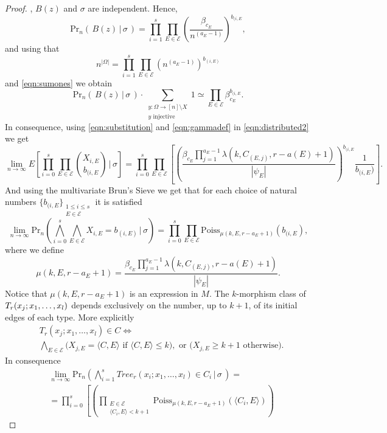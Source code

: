 \documentclass[11pt,notitlepage,a4paper]{article}
\theoremstyle{definition}
\newcommand{\Ln}{\lim\limits_{n\to \infty}}
\begin{document}
\begin{proof}
 	, $B(z)$ and $\sigma$ are independent. Hence,
 	\[ \mathrm{Pr}_n(\, B(z) \, | \, \sigma \, ) = \prod_{i=1}^{s} 
 	\prod_{E\in \mathcal{E}} \left(\frac{\beta_{c_E}}{n^{(a_E -1)}}
 	\right)^{b_{(i,E}},  \]
 	and using that
 	\[  n^{|\Omega|}= \prod_{i=1}^{s} 
 	\prod_{E\in \mathcal{E}} (n^{(a_E-1)})^{b_{(i,E)}}  \]
 	and \cref{eqn:sumones} we obtain 
 	\begin{equation} \label{eqn:substitution}
 	\mathrm{Pr}_n(\, B(z) \, | \, \sigma \, )\cdot \sum_{\substack{y:
 	\Omega \rightarrow [n]\setminus X\\ y \text{ injective}}} 1 \simeq 	
 	\prod_{E\in \mathcal{E}} \beta_{c_E}^{b_{(i,E}}. 
 	\end{equation}
 	In consequence, using \cref{eqn:substitution} and \cref{eqn:gammadef} in
 	\cref{eqn:distributed2} we get
 	\[ \Ln E\left[\prod_{i=0}^{s}\prod_{E\in \mathcal{E}}
 	\binom{X_{i,E}}{b_{(i,E}} \, \Bigg| \, \sigma \right]= \prod_{i=0}^{s}\prod_{E\in \mathcal{E}}
 	\left[ 	\left(\frac{\beta_{c_E} \prod_{j=1}^{a_E -1} \lambda(k,C_{(E,j)},r-a(E)+1)}{|\psi_E|}\right)^{b_{(i,E}} \frac{1}{b_{(i,E})} \right]. \]
 	And using the multivariate Brun's Sieve we get that for each
 	choice of natural numbers $\{b_{(i,E}\}_{\substack{1\leq i \leq s\\ 
 	E\in \mathcal{E}}}$ it is satisfied
 	\[ \Ln \mathrm{Pr}_n\left(\bigwedge_{i=0}^{s}\bigwedge_{E\in \mathcal{E}} X_{i,E}=b_{(i,E)} \, \Bigg| \, \sigma \right) = 
 	\prod_{i=0}^{s}\prod_{E\in \mathcal{E}}
 	\mathrm{Poiss}_{\mu(k,E,r-a_E+1)}(b_{(i,E}),\]
 	where we define
 	\[\mu(k,E,r-a_E+1)=
 	\frac{\beta_{c_E} \prod_{j=1}^{a_E -1} \lambda(k,C_{(E,j)},r-a(E)+1) }{|\psi_E|}.\]
 	Notice that $\mu(k,E,r-a_E+1)$ is an expression in $M$.
 	The $k$-morphism class of $\\T_r(x_j;x_1, \dots, x_l)$ depends exclusively
 	on the number, up to $k+1$, of its initial edges of each type.
 	More explicitly
 	\begin{align*}
 	&T_r(x_j;x_1, \dots, x_l)\in C \iff \\
 	& \bigwedge_{E\in \mathcal{E}}
 	\big(X_{j, E}= \langle C, E \rangle \text{  if  } \langle C, E \rangle\leq k \big),
 	\text{  or  }  \big(X_{j, E}\geq k+1 \text{ otherwise}\big). 
 	\end{align*}
 	In consequence 
 	\begin{align*}
 	&\Ln \mathrm{Pr}_n(\bigwedge_{i=1}^s Tree_r(x_i; x_1, \dots, x_l)\in C_i \, | 
 	\, \sigma \,)=\\ 
 	&=\prod_{i=0}^{s}\left[
 	\left(\prod_{\substack{E\in \mathcal{E}\\ \langle C_i, E \rangle <k+1}} \mathrm{Poiss}_{\mu(k,E,r-a_E+1)}(\langle C_i, E \rangle )\right)

\end{align*}
\end{proof}
\end{document}
